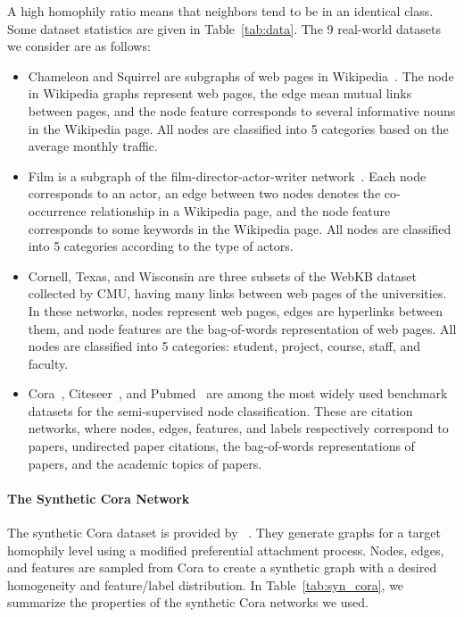 \documentclass{article}
\theoremstyle{plain}
\theoremstyle{definition}
\theoremstyle{remark}
\begin{document}
A high homophily ratio means that neighbors tend to be in an identical class. Some dataset statistics are given in Table~\ref{tab:data}. The 9 real-world datasets we consider are as follows:
\begin{itemize}
    \item Chameleon and Squirrel are subgraphs of web pages in Wikipedia~\cite{benedek2021musae}. The node in Wikipedia graphs represent web pages, the edge mean mutual links between pages, and the node feature corresponds to several informative nouns in the Wikipedia page. All nodes are classified into 5 categories based on the average monthly traffic.
    \item Film is a subgraph of the film-director-actor-writer network~\cite{tang2009social}. Each node corresponds to an actor, an edge between two nodes denotes the co-occurrence relationship in a Wikipedia page, and the node feature corresponds to some keywords in the Wikipedia page. All nodes are classified into 5 categories according to the type of actors.
    \item Cornell, Texas, and Wisconsin are three subsets of the WebKB dataset collected by CMU, having many links between web pages of the universities. In these networks, nodes represent web pages, edges are hyperlinks between them, and node features are the bag-of-words representation of web pages. All nodes are classified into 5 categories: student, project, course, staff, and faculty.
    \item Cora~\cite{mccallum2000automating}, Citeseer~\cite{sen2008collective}, and Pubmed~\cite{yang2016revisiting} are among the most widely used benchmark datasets for the semi-supervised node classification. These are citation networks, where nodes, edges, features, and labels respectively correspond to papers, undirected paper citations, the bag-of-words representations of papers, and the academic topics of papers.
\end{itemize}

\paragraph{The Synthetic Cora Network}
The synthetic Cora dataset is provided by ~\cite{zhu2020h2gcn}. They generate graphs for a target homophily level using a modified preferential attachment process. Nodes, edges, and features are sampled from Cora to create a synthetic graph with a desired homogeneity and feature/label distribution. In Table~\ref{tab:syn_cora}, we summarize the properties of the synthetic Cora networks we used. 
\end{document}
